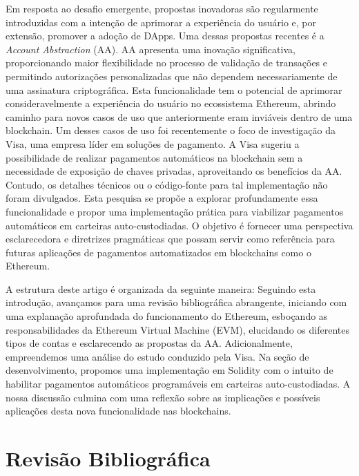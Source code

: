 \documentclass[12pt]{article}
\begin{document}
Em resposta ao desafio emergente, propostas inovadoras são regularmente introduzidas com a intenção
de aprimorar a experiência do usuário e, por extensão, promover a adoção de DApps. Uma dessas
propostas recentes é a \textit{Account Abstraction} (AA). AA apresenta uma inovação significativa,
proporcionando maior flexibilidade no processo de validação de transações e permitindo autorizações
personalizadas que não dependem necessariamente de uma assinatura criptográfica. Esta
funcionalidade tem o potencial de aprimorar consideravelmente a experiência do usuário no
ecossistema Ethereum\cite{12}, abrindo caminho para novos casos de uso que anteriormente eram
inviáveis dentro de uma blockchain. Um desses casos de uso foi recentemente o foco de investigação
da Visa, uma empresa líder em soluções de pagamento. A Visa sugeriu a possibilidade de realizar
pagamentos automáticos na blockchain sem a necessidade de exposição de chaves privadas,
aproveitando os benefícios da AA\cite{9}. Contudo, os detalhes técnicos ou o código-fonte para tal
implementação não foram divulgados. Esta pesquisa se propõe a explorar profundamente essa
funcionalidade e propor uma implementação prática para viabilizar pagamentos automáticos em
carteiras auto-custodiadas. O objetivo é fornecer uma perspectiva esclarecedora e diretrizes
pragmáticas que possam servir como referência para futuras aplicações de pagamentos automatizados
em blockchains como o Ethereum.

A estrutura deste artigo é organizada da seguinte maneira: Seguindo esta introdução, avançamos para
uma revisão bibliográfica abrangente, iniciando com uma explanação aprofundada do funcionamento do
Ethereum, esboçando as responsabilidades da Ethereum Virtual Machine (EVM), elucidando os
diferentes tipos de contas e esclarecendo as propostas da AA. Adicionalmente, empreendemos uma
análise do estudo conduzido pela Visa. Na seção de desenvolvimento, propomos uma implementação em
Solidity com o intuito de habilitar pagamentos automáticos programáveis em carteiras
auto-custodiadas. A nossa discussão culmina com uma reflexão sobre as implicações e possíveis
aplicações desta nova funcionalidade nas blockchains.

\section{Revisão Bibliográfica}\label{sec:revisao}
\end{document}
